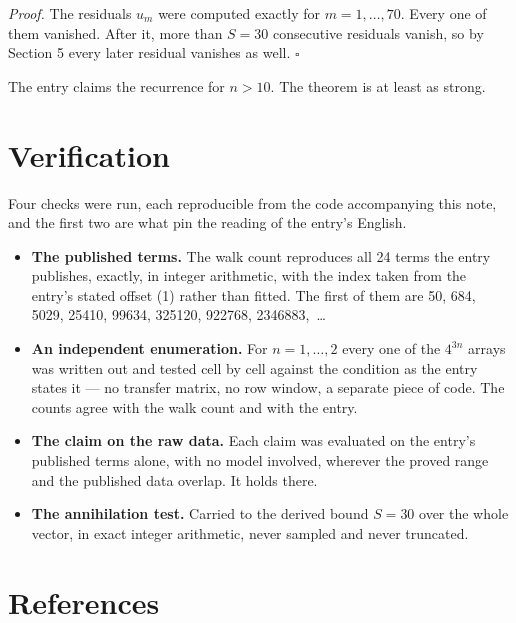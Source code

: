 \documentclass[11pt]{article}
\theoremstyle{definition}
\begin{document}
{\itshape Proof.} The residuals $u_m$ were computed exactly for $m = 1,\dots,70$. Every one of them vanished. After it, more than $S = 30$ consecutive residuals vanish, so by Section 5 every later residual vanishes as well. $\square$

The entry claims the recurrence for $n > 10$. The theorem is at least as strong.

\section{Verification}

Four checks were run, each reproducible from the code accompanying this note, and the first two are what pin the reading of the entry's English.

\begin{itemize}

\item {\bfseries The published terms.} The walk count reproduces all 24 terms the entry publishes, exactly, in integer arithmetic, with the index taken from the entry's stated offset (1) rather than fitted. The first of them are 50, 684, 5029, 25410, 99634, 325120, 922768, 2346883,~\dots

\item {\bfseries An independent enumeration.} For $n = 1,\dots,2$ every one of the $4^{3n}$ arrays was written out and tested cell by cell against the condition as the entry states it --- no transfer matrix, no row window, a separate piece of code. The counts agree with the walk count and with the entry.

\item {\bfseries The claim on the raw data.} Each claim was evaluated on the entry's published terms alone, with no model involved, wherever the proved range and the published data overlap. It holds there.

\item {\bfseries The annihilation test.} Carried to the derived bound $S = 30$ over the whole vector, in exact integer arithmetic, never sampled and never truncated.

\end{itemize}

\section{References}
\end{document}
